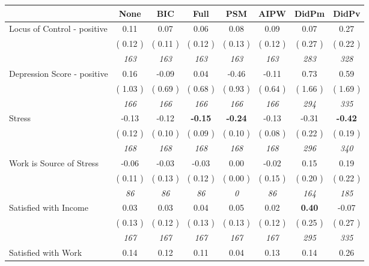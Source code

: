 \begin{tabular}{l c c c c c c c}
\toprule
 & None & BIC & Full & PSM & AIPW & DidPm & DidPv \\
\midrule
Locus of Control - positive &      0.11 &      0.07 &      0.06 &      0.08 &      0.09 &      0.07 &      0.27 \\
& (     0.12 ) & (     0.11 ) & (     0.12 ) & (     0.13 ) & (     0.12 ) & (     0.27 ) & (     0.22 ) \\
& \textit{ 163 } & \textit{ 163 } & \textit{ 163 } & \textit{ 163 } & \textit{ 163 } & \textit{ 283 } & \textit{ 328 } \\
Depression Score - positive &      0.16 &     -0.09 &      0.04 &     -0.46 &     -0.11 &      0.73 &      0.59 \\
& (     1.03 ) & (     0.69 ) & (     0.68 ) & (     0.93 ) & (     0.64 ) & (     1.66 ) & (     1.69 ) \\
& \textit{ 166 } & \textit{ 166 } & \textit{ 166 } & \textit{ 166 } & \textit{ 166 } & \textit{ 294 } & \textit{ 335 } \\
Stress &     -0.13 &     -0.12 & \textbf{     -0.15 } & \textbf{    -0.24} &     -0.13 &     -0.31 & \textbf{     -0.42 } \\
& (     0.12 ) & (     0.10 ) & (     0.09 ) & (     0.10 ) & (     0.08 ) & (     0.22 ) & (     0.19 ) \\
& \textit{ 168 } & \textit{ 168 } & \textit{ 168 } & \textit{ 168 } & \textit{ 168 } & \textit{ 296 } & \textit{ 340 } \\
Work is Source of Stress &     -0.06 &     -0.03 &     -0.03 &      0.00 &     -0.02 &      0.15 &      0.19 \\
& (     0.11 ) & (     0.13 ) & (     0.12 ) & (     0.00 ) & (     0.15 ) & (     0.20 ) & (     0.22 ) \\
& \textit{ 86 } & \textit{ 86 } & \textit{ 86 } & \textit{ 0 } & \textit{ 86 } & \textit{ 164 } & \textit{ 185 } \\
Satisfied with Income &      0.03 &      0.03 &      0.04 &      0.05 &      0.02 & \textbf{      0.40 } &     -0.07 \\
& (     0.13 ) & (     0.12 ) & (     0.13 ) & (     0.13 ) & (     0.12 ) & (     0.25 ) & (     0.27 ) \\
& \textit{ 167 } & \textit{ 167 } & \textit{ 167 } & \textit{ 167 } & \textit{ 167 } & \textit{ 295 } & \textit{ 335 } \\
Satisfied with Work &      0.14 &      0.12 &      0.11 &      0.04 &      0.13 &      0.14 &      0.26 \\

\end{tabular}
